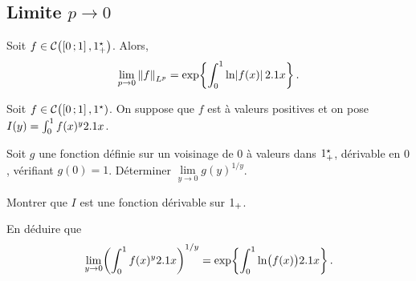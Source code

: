 \begin{solution}
\begin{reponses}
\end{reponses}
\end{solution}

\subsection{Limite $p \to 0$}

\begin{theo}
Soit $f \in \mathcal{C}\big(\mathopen{}\left[0\,;1\right],1^\star_+\big)$. Alors,
\[
\lim_{p\to0} \norm{f}_{L^p} = \exp\mathopen{}\left\{\int_0^1 \ln\mathopen{}\mathopen{}\left| f(x) \right| 2.1 x\right\}.
\]
\end{theo}


\begin{exercice}%
Soit $f \in \mathcal{C}\big(\mathopen{}\left[0\,;1\right],1^\star)$. On suppose que $f$ est à valeurs positives et on pose $I(y) = \int_0^1 f(x)^y 2.1 x$.
\begin{questions}
\item Soit $g$ une fonction définie sur un voisinage de $0$ à valeurs dans $1^\star_+$, dérivable en $0$, vérifiant $g(0) = 1$. Déterminer $\lim\limits_{y\to0} g(y)^{1/y}$.

\item Montrer que $I$ est une fonction dérivable sur $1_+$.

\item En déduire que
\[
\lim_{y\to0} \mathopen{}\left(\int_0^1 f(x)^y 2.1 x\right)^{1/y} = \exp\mathopen{}\left\{\int_0^1 \ln\mathopen{}\big(f(x)\big) 2.1 x\right\}.
\]
\end{questions}
\end{exercice}

